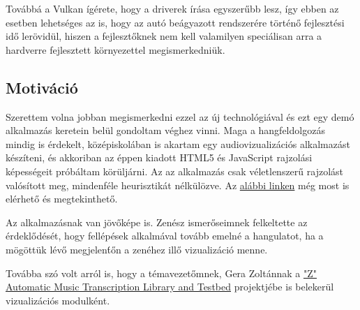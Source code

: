 Tov\'abb\'a a Vulkan \'ig\'erete, hogy a driverek \'ir\'asa egyszer\H ubb lesz, \'igy ebben az esetben lehets\'eges az is, hogy az aut\'o be\'agyazott rendszer\'ere t\"ort\'en\H o fejleszt\'esi id\H o ler\"ovid\"ul, hiszen a fejleszt\H oknek nem kell valamilyen speci\'alisan arra a hardverre fejlesztett k\"ornyezettel megismerkedni\"uk. 

\subsection{Motiv\'aci\'o}
Szerettem volna jobban megismerkedni ezzel az \'uj technol\'ogi\'aval \'es ezt egy dem\'o alkalmaz\'as keretein bel\"ul gondoltam v\'eghez vinni. Maga a hangfeldolgoz\'as mindig is \'erdekelt, k\"oz\'episkol\'aban is akartam egy audiovizualiz\'aci\'os alkalmaz\'ast k\'esz\'iteni, \'es akkoriban az \'eppen kiadott HTML5 \'es JavaScript rajzol\'asi k\'epess\'egeit pr\'ob\'altam k\"or\"ulj\'arni. Az az alkalmaz\'as csak v\'eletlenszer\H u rajzol\'ast val\'os\'itott meg, mindenf\'ele heurisztik\'at n\'elk\"ul\"ozve. Az \href{http://users.atw.hu/bypetii/visual.html}{al\'abbi linken} m\'eg most is el\'erhet\H o \'es megtekinthet\H o.

Az alkalmaz\'asnak van j\"ov\H ok\'epe is. Zen\'esz ismer\H oseimnek felkeltette az \'erdekl\H od\'es\'et, hogy fell\'ep\'esek alkalm\'aval tov\'abb emeln\'e a hangulatot, ha a m\"og\"ott\"uk l\'ev\H o megjelen\'t\H on a zen\'ehez ill\H o vizualiz\'aci\'o menne.

Tov\'abba sz\'o volt arr\'ol is, hogy a t\'emavezet\H omnek, Gera Zolt\'annak a \href{https://github.com/gerazo/zamt}{"Z" Automatic Music Transcription Library and Testbed} projektj\'ebe is beleker\"ul vizualiz\'aci\'os modulk\'ent.
